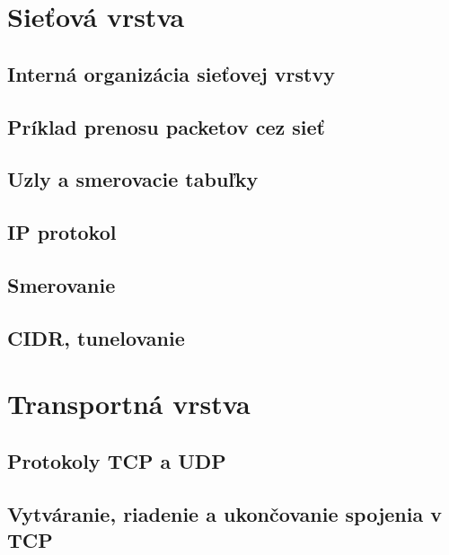 \documentclass[10pt,a4paper]{article}
\begin{document}
\section{Sieťová vrstva}                      
\subsection{Interná organizácia sieťovej vrstvy} 
\subsection{Príklad prenosu packetov cez sieť} 
\subsection{Uzly a smerovacie tabuľky}     
\subsection{IP protokol}               
\subsection{Smerovanie}             
\subsection{CIDR, tunelovanie}                                                                     
\section{Transportná vrstva}        
\subsection{Protokoly TCP a UDP}   
\subsection{Vytváranie, riadenie a ukončovanie spojenia v TCP} 
\end{document}
